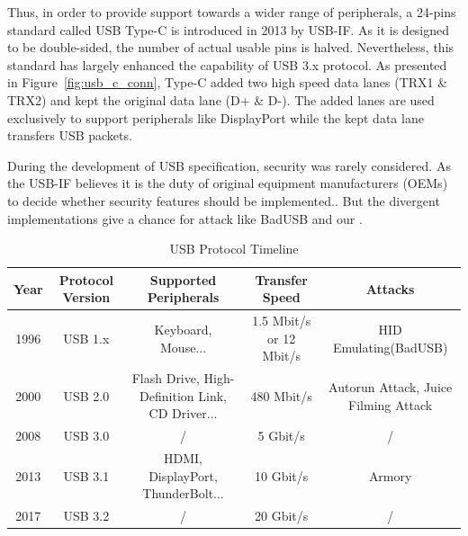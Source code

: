 Thus, in order to provide support towards a wider range of peripherals, a 24-pins standard called USB Type-C is introduced in 2013 by USB-IF. As it is designed to be double-sided, the number of actual usable pins is halved. Nevertheless, this standard has largely enhanced the capability of USB 3.x protocol. As presented in Figure~\ref{fig:usb_c_conn}, Type-C added two high speed data lanes (TRX1 \& TRX2) and kept the original data lane (D+ \& D-). The added lanes are used exclusively to support peripherals like DisplayPort while the kept data lane transfers USB packets.

During the development of USB specification, security was rarely considered.  As the USB-IF believes it is the duty of original equipment manufacturers (OEMs) to decide whether security features should be implemented.. But the divergent implementations give a chance for attack like BadUSB\cite{rubber} and our \tool.


\begin{table}
\begin{tabular}{|c|c|c|c|c|}
	\hline
	Year & Protocol Version & Supported Peripherals & Transfer Speed & Attacks \\
	\hline
	1996 & USB 1.x & Keyboard, Mouse... & 1.5 Mbit/s or 12 Mbit/s & HID Emulating(BadUSB) \\
	\hline
	2000 & USB 2.0 & Flash Drive, High-Definition Link, CD Driver... & 480 Mbit/s & Autorun Attack, Juice Filming Attack \\
	\hline
	2008 & USB 3.0 & / & 5 Gbit/s & / \\
	\hline
	2013 & USB 3.1 & HDMI, DisplayPort, ThunderBolt... & 10 Gbit/s & Armory \\
	\hline
	2017 & USB 3.2 & / & 20 Gbit/s & / \\
	\hline
\end{tabular}
	\linebreak
\caption{USB Protocol Timeline}
\label{table:usb_timeline}
\end{table}